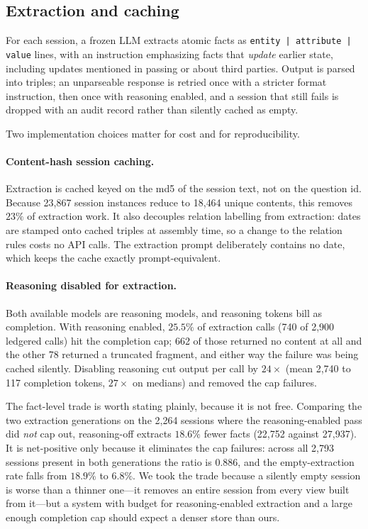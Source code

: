 \documentclass[11pt]{article}
\begin{document}
\subsection{Extraction and caching}
\label{sec:extraction}

For each session, a frozen LLM extracts atomic facts as \texttt{entity | attribute | value} lines, with an instruction emphasizing facts that \emph{update} earlier state, including updates mentioned in passing or about third parties. Output is parsed into triples; an unparseable response is retried once with a stricter format instruction, then once with reasoning enabled, and a session that still fails is dropped with an audit record rather than silently cached as empty.

Two implementation choices matter for cost and for reproducibility.

\paragraph{Content-hash session caching.} Extraction is cached keyed on the md5 of the session text, not on the question id. Because 23{,}867 session instances reduce to 18{,}464 unique contents, this removes $23\%$ of extraction work. It also decouples relation labelling from extraction: dates are stamped onto cached triples at assembly time, so a change to the relation rules costs no API calls. The extraction prompt deliberately contains no date, which keeps the cache exactly prompt-equivalent.

\paragraph{Reasoning disabled for extraction.} Both available models are reasoning models, and reasoning tokens bill as completion. With reasoning enabled, $25.5\%$ of extraction calls (740 of 2{,}900 ledgered calls) hit the completion cap; 662 of those returned no content at all and the other 78 returned a truncated fragment, and either way the failure was being cached silently. Disabling reasoning cut output per call by $24\times$ (mean 2{,}740 to 117 completion tokens, $27\times$ on medians) and removed the cap failures.

The fact-level trade is worth stating plainly, because it is not free. Comparing the two extraction generations on the 2{,}264 sessions where the reasoning-enabled pass did \emph{not} cap out, reasoning-off extracts $18.6\%$ fewer facts (22{,}752 against 27{,}937). It is net-positive only because it eliminates the cap failures: across all 2{,}793 sessions present in both generations the ratio is $0.886$, and the empty-extraction rate falls from $18.9\%$ to $6.8\%$. We took the trade because a silently empty session is worse than a thinner one---it removes an entire session from every view built from it---but a system with budget for reasoning-enabled extraction and a large enough completion cap should expect a denser store than ours.
\end{document}
